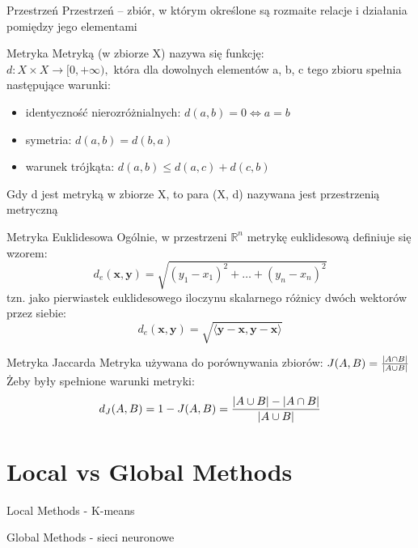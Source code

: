 \documentclass[a4paper]{beamer}
\begin{document}
\begin{frame}
\begin{block}{Przestrzeń}
Przestrzeń – zbiór, w którym określone są rozmaite relacje i działania pomiędzy jego elementami
\end{block}
\begin{block}{Metryka}
Metryką (w zbiorze X) nazywa się funkcję: \\
$d: X \times X \to [0, +\infty),$
która dla dowolnych elementów a, b, c tego zbioru spełnia następujące warunki:
\begin{itemize}
\item identyczność nierozróżnialnych: $d(a, b) = 0 \iff a = b$
\item symetria: $d(a, b) = d(b, a)$
\item warunek trójkąta: $d(a, b) \leqslant d(a, c) + d(c, b)$
\end{itemize}
Gdy d jest metryką w zbiorze X, to para (X, d) nazywana jest przestrzenią metryczną
\end{block}
\end{frame}
\begin{frame}
\begin{block}{Metryka Euklidesowa}
Ogólnie, w przestrzeni $\mathbb R^n$ metrykę euklidesową definiuje się wzorem:
$$d_e(\mathbf x, \mathbf y) = \sqrt{(y_1 - x_1)^2 + \dots + (y_n - x_n)^2}$$
tzn. jako pierwiastek euklidesowego iloczynu skalarnego różnicy dwóch wektorów przez siebie:
$$d_e(\mathbf x, \mathbf y) = \sqrt{\langle \mathbf y - \mathbf x, \mathbf y - \mathbf x \rangle}$$
\end{block}
\begin{block}{Metryka Jaccarda}
Metryka używana do porównywania zbiorów:
$J(A,B) = {{|A \cap B|}\over{|A \cup B|}}$ \\
Żeby były spełnione warunki metryki:
$$d_J(A,B) = 1 - J(A,B) = { { |A \cup B| - |A \cap B| } \over |A \cup B| }$$
\end{block}
\end{frame}

\section{Local vs Global Methods}
\begin{frame}
\begin{block}{Local Methods}
- K-means
\end{block}
\begin{block}{Global Methods}
- sieci neuronowe
\end{block}
\end{frame}
\end{document}
